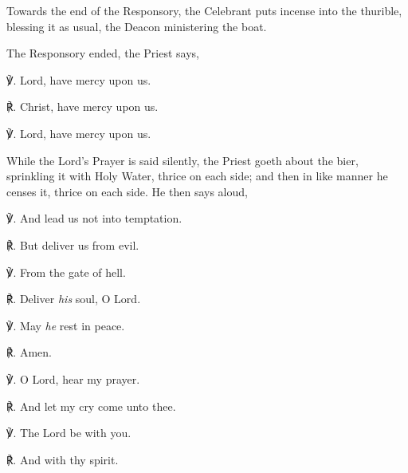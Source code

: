 \begin{rubric}
    Towards the end of the Responsory, the Celebrant puts incense into the thurible, blessing it as usual, the Deacon ministering the boat.
\end{rubric}
\begin{rubric}
	The Responsory ended, the Priest says,
\end{rubric}

℣. Lord, have mercy upon us.

℟. Christ, have mercy upon us.

℣. Lord, have mercy upon us.

\begin{rubric}
	While the Lord's Prayer is said silently, the Priest goeth about the bier, sprinkling it with Holy Water, thrice on each side; and then in like manner he censes it, thrice on each side. He then says aloud,
\end{rubric}
℣. And lead us not into temptation.

℟. But deliver us from evil.

\vspace{0.5\baselineskip}

℣. From the gate of hell.

℟. Deliver \textit{his} soul, O Lord.

℣. May \textit{he} rest in peace.

℟. Amen.

℣. O Lord, hear my prayer.

℟. And let my cry come unto thee.

℣. The Lord be with you.

℟. And with thy spirit.

